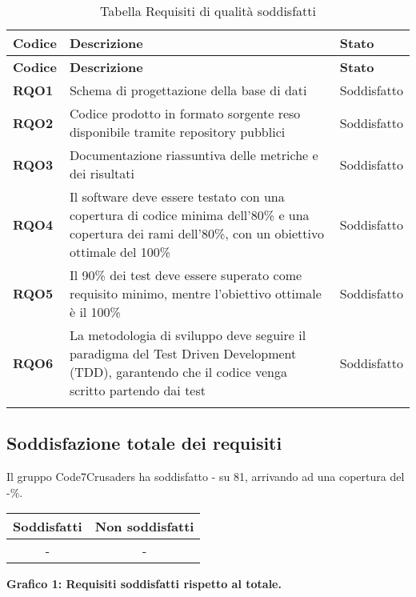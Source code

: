 \begin{longtable}{|>{\centering\arraybackslash}m{}|>{\centering\arraybackslash}m{}|>{\centering\arraybackslash}m{}|}
	\hline
	\textbf{Codice} & \textbf{Descrizione} & \textbf{Stato}\\\hline
	\endfirsthead
	\hline
	\textbf{Codice} & \textbf{Descrizione} & \textbf{Stato}\\\hline
	\endhead
	\hline
    \textbf{RQO1} & Schema di progettazione della base di dati & Soddisfatto \\
    \hline
    \textbf{RQO2} & Codice prodotto in formato sorgente reso disponibile tramite repository pubblici & Soddisfatto \\
    \hline
    \textbf{RQO3} & Documentazione riassuntiva delle metriche e dei risultati & Soddisfatto \\
    \hline
    \textbf{RQO4} & Il software deve essere testato con una copertura di codice minima dell'80\% e una copertura dei rami dell'80\%, con un obiettivo ottimale del 100\% & Soddisfatto \\
    \hline
    \textbf{RQO5} & Il 90\% dei test deve essere superato come requisito minimo, mentre l'obiettivo ottimale è il 100\% & Soddisfatto \\
    \hline
    \textbf{RQO6} & La metodologia di sviluppo deve seguire il paradigma del Test Driven Development (TDD), garantendo che il codice venga scritto partendo dai test & Soddisfatto \\
    \hline

\caption{Tabella Requisiti di qualità soddisfatti}
\end{longtable}


\subsection{Soddisfazione totale dei requisiti}
Il gruppo Code7Crusaders ha soddisfatto - su 81, arrivando ad una copertura del -\%.
\begin{center}
\begin{tabular}{|c|c|}
\hline
\textbf{Soddisfatti} & \textbf{Non soddisfatti} \\
\hline
- & - \\
\hline
\end{tabular}
\end{center}
\begin{center}
\textbf{Grafico 1: Requisiti soddisfatti rispetto al totale.}
\end{center}

